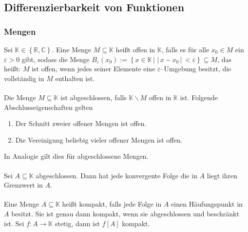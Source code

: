\documentclass[a4paper,12pt]{article}
\numberwithin{equation}{section}
\begin{document}
\subsection{Differenzierbarkeit von Funktionen}
\subsubsection{Mengen}
Sei $\mathbb{K} \in \left\{\mathbb{R},\mathbb{C}\right\}$. Eine Menge $M\subseteq \mathbb{K}$ heißt offen in $\mathbb{K}$, falls es für alle $x_0 \in M$ ein $\varepsilon >0$ gibt, sodass die Menge $B_{\varepsilon }\left(x_0\right):=\left\{x \in \mathbb{K}\,|\, \,|\, x-x_0\,|\, <\varepsilon \right\}\subseteq M$, das heißt: $M$ ist offen, wenn jedes seiner Elemente eine $\varepsilon $--Umgebung besitzt, die vollständig in $M$ enthalten ist.\\\\ 
Die Menge $M\subseteq \mathbb{K}$ ist abgeschlossen, falls $\mathbb{K}\backslash M$ offen in $\mathbb{K}$ ist. Folgende Abschlusseigenschaften gelten
\begin{enumerate}[label=(\roman*)]
        \item Der Schnitt zweier offener Mengen ist offen.
        \item Die Vereinigung beliebig vieler offener Mengen ist offen.
\end{enumerate}
In Analogie gilt dies für abgeschlossene Mengen.\\\\
Sei $A\subseteq \mathbb{K}$ abgeschlossen. Dann hat jede konvergente Folge die in $A$ liegt ihren Grenzwert in $A$.\\\\
Eine Menge $A\subseteq \mathbb{K}$ heißt kompakt, falls jede Folge in $A$ einen Häufungspunkt in $A$ besitzt. Sie ist genau dann kompakt, wenn sie abgeschlossen und beschränkt ist. Sei $f:A\rightarrow \mathbb{K}$ stetig, dann ist $f[A]$ kompakt.
\end{document}
